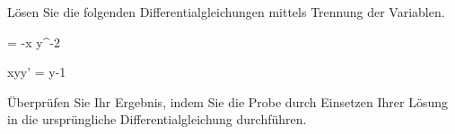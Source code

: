 \begin{atiTask}[
	title = Zwei separable Differentialgleichungen,
	language = Deutsch
]
	Lösen Sie die folgenden Differentialgleichungen mittels Trennung der Variablen.
	\begin{atiSubequations}
		\medskip
		\begin{minipage}[t]{0.5\textwidth}
		\item{
			 = -\tan x \cdot y^{-2}
		}
		\end{minipage}
		\item{
			xyy' = y-1
		}
	\end{atiSubequations}
	Überprüfen Sie Ihr Ergebnis, indem Sie die Probe durch Einsetzen Ihrer Lösung in die ursprüngliche Differentialgleichung durchführen.
\end{atiTask}